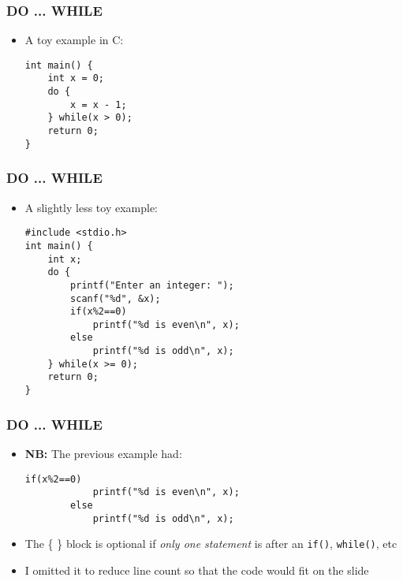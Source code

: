 \documentclass[14pt]{beamer}
\begin{document}
\begin{frame}[fragile]
\frametitle{DO ... WHILE}
\begin{itemize}
\item A toy example in C:
\begin{lstlisting}[style=CStyle]
int main() {
	int x = 0;
	do {
		x = x - 1;
	} while(x > 0);
	return 0;
}
\end{lstlisting}
\end{itemize}
\end{frame}

\begin{frame}[fragile]
\frametitle{DO ... WHILE}
\begin{itemize}
\item A slightly less toy example:
\begin{lstlisting}[style=CStyle]
#include <stdio.h>
int main() {
	int x;
	do {
		printf("Enter an integer: ");
		scanf("%d", &x);
		if(x%2==0)
			printf("%d is even\n", x);
		else
			printf("%d is odd\n", x);
	} while(x >= 0);
	return 0;
}
\end{lstlisting}
\end{itemize}
\end{frame}

\begin{frame}[fragile]
\frametitle{DO ... WHILE}
\begin{itemize}
\item \textbf{NB:} The previous example had:
\begin{lstlisting}[style=CStyle]
		if(x%2==0)
			printf("%d is even\n", x);
		else
			printf("%d is odd\n", x);
\end{lstlisting}
\item The \{ \} block is optional if \textit{only one statement} is after an \texttt{if()}, \texttt{while()}, etc
\item I omitted it to reduce line count so that the code would fit on the slide
\end{itemize}
\end{frame}
\end{document}
